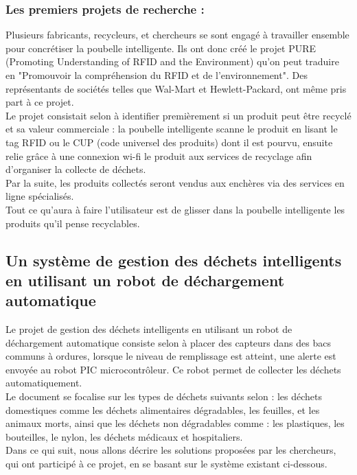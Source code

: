 \documentclass[a4paper,12pt]{report}
\begin{document}
\subsubsection*{Les premiers projets de recherche :}
Plusieurs fabricants, recycleurs, et chercheurs se sont engagé à travailler ensemble pour concrétiser la poubelle intelligente. Ils ont donc créé le projet PURE  (Promoting Understanding of RFID and the Environment) qu'on peut traduire en "Promouvoir la compréhension du RFID et de l'environnement". Des représentants de sociétés telles que Wal-Mart et Hewlett-Packard, ont même pris part à ce projet.\\
Le projet consistait selon \cite{ref18} à identifier premièrement si un produit peut être recyclé et sa valeur commerciale : la poubelle intelligente scanne le produit en lisant le tag RFID ou le  CUP (code universel des produits) dont il est pourvu, ensuite relie grâce à une connexion wi-fi le produit aux services de recyclage afin d'organiser la collecte de déchets.\\
Par la suite, les produits collectés seront vendus aux enchères via des services en ligne spécialisés.\\
Tout ce qu'aura à faire l'utilisateur est de glisser dans la poubelle intelligente les produits qu'il pense recyclables.\\





 




\subsection{Un système de gestion des déchets intelligents en utilisant un robot de déchargement automatique}
Le projet de gestion des déchets intelligents en utilisant un robot de déchargement automatique consiste selon \cite{ref19} à placer des capteurs dans des bacs communs à ordures, lorsque le niveau de remplissage est atteint, une alerte est envoyée au robot PIC microcontrôleur. Ce robot permet de collecter les déchets automatiquement.\\

Le document se focalise sur les types de déchets suivants selon \cite{ref19} : les déchets domestiques comme les déchets alimentaires dégradables, les feuilles, et les animaux morts, ainsi que les déchets non dégradables comme : les plastiques, les bouteilles, le nylon, les déchets médicaux et hospitaliers.\\
Dans ce qui suit, nous allons décrire les solutions proposées par les chercheurs, qui ont participé à ce projet, en se basant sur le système existant ci-dessous.
\end{document}
